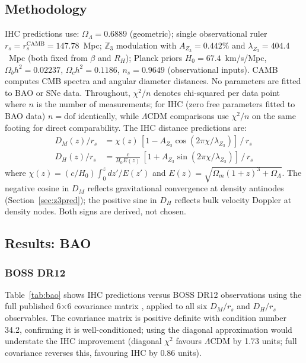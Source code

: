\documentclass[12pt,a4paper]{article}
\begin{document}
\subsection{Methodology}
\label{sec:methodology}

IHC predictions use: $\Omega_\Lambda = 0.6889$ (geometric); single observational
ruler $r_s = r_s^\mathrm{CAMB} = 147.78$~Mpc; $\mathbb{Z}_3$ modulation with
$A_{Z_3} = 0.442\%$ and $\lambda_{Z_3} = 404.4$~Mpc (both fixed from $\beta$
and $R_H$); Planck priors $H_0 = 67.4$~km/s/Mpc, $\Omega_b h^2 = 0.02237$,
$\Omega_c h^2 = 0.1186$, $n_s = 0.9649$ (observational inputs). CAMB \citep{CAMB}
computes CMB spectra and angular diameter distances. No parameters are fitted to
BAO or SNe data. Throughout, $\chi^2/n$ denotes chi-squared per data point where
$n$ is the number of measurements; for IHC (zero free parameters fitted to BAO
data) $n = \mathrm{dof}$ identically, while $\Lambda$CDM comparisons use $\chi^2/n$
on the same footing for direct comparability. The IHC distance predictions are:
\begin{align}
  D_M(z)/r_s &= \chi(z)\,[1 - A_{Z_3}\cos(2\pi\chi/\lambda_{Z_3})]\,/\,r_s \label{eq:DM_pred}\\
  D_H(z)/r_s &= \frac{c}{H_0 E(z)}\,[1 + A_{Z_3}\sin(2\pi\chi/\lambda_{Z_3})]\,/\,r_s \label{eq:DH_pred}
\end{align}
where $\chi(z) = (c/H_0)\int_0^z dz'/E(z')$ and $E(z) = \sqrt{\Omega_m(1+z)^3 + \Omega_\Lambda}$.
The negative cosine in $D_M$ reflects gravitational convergence at density antinodes
(Section~\ref{sec:z3pred}); the positive sine in $D_H$ reflects bulk velocity Doppler
at density nodes. Both signs are derived, not chosen.

\subsection{Results: BAO}

\subsubsection{BOSS DR12}
\label{sec:boss_bic}

Table~\ref{tab:bao} shows IHC predictions versus BOSS DR12 observations using the
full published 6$\times$6 covariance matrix \citep{Alam2017}, applied to all six
$D_M/r_s$ and $D_H/r_s$ observables. The covariance matrix is positive definite
with condition number 34.2, confirming it is well-conditioned; using the diagonal
approximation would understate the IHC improvement (diagonal $\chi^2$ favours $\Lambda$CDM
by 1.73 units; full covariance reverses this, favouring IHC by 0.86 units).
\end{document}
